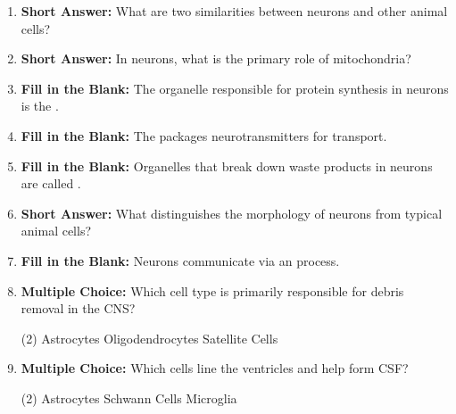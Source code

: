 \begin{enumerate}[label=\textbf{Q2.1.\arabic*}]
      \item \textbf{Short Answer:} What are two similarities between neurons and other animal cells? \\

      \item \textbf{Short Answer:} In neurons, what is the primary role of mitochondria? \\

      \item \textbf{Fill in the Blank:} The organelle responsible for protein synthesis in neurons is the . \\

      \item \textbf{Fill in the Blank:} The  packages neurotransmitters for transport. \\
      
      \item \textbf{Fill in the Blank:} Organelles that break down waste products in neurons are called . \\
      \item \textbf{Short Answer:} What distinguishes the morphology of neurons from typical animal cells? \\

      \item \textbf{Fill in the Blank:} Neurons communicate via an  process. \\

      \item \textbf{Multiple Choice:} Which cell type is primarily responsible for debris removal in the CNS?
            \begin{tasks}[label=\textcolor{draculafg}{(\Alph*)}, item-format=\color{draculafg}, label-width=1.5em, item-indent=1.7em](2)
                  \task {}
                  \task Astrocytes
                  \task Oligodendrocytes
                  \task Satellite Cells
            \end{tasks}
            
      \item \textbf{Multiple Choice:} Which cells line the ventricles and help form CSF?
            \begin{tasks}[label=\textcolor{draculafg}{(\Alph*)}, item-format=\color{draculafg}, label-width=1.5em, item-indent=1.7em](2)
                  \task Astrocytes
                  \task {}
                  \task Schwann Cells
                  \task Microglia
            \end{tasks}
            

\end{enumerate}
